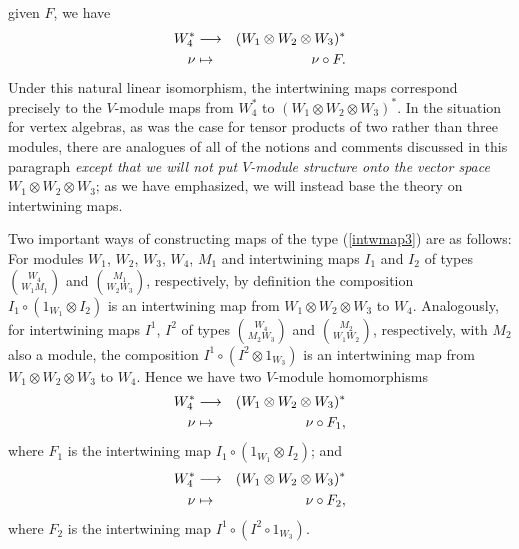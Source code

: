 \documentclass[12pt]{article}
\begin{document}
given $F$, we have
\begin{eqnarray}
W^*_4 &\longrightarrow &(W_1\otimes W_2\otimes
W_3)^*\nonumber\\
\nu&\mapsto &\nu\circ F.
\end{eqnarray}
Under this natural linear isomorphism, the intertwining maps
correspond precisely to the $V$-module maps {}from $W^*_4$ to
$(W_1\otimes W_2\otimes W_3)^*$.  In the situation for vertex
algebras, as was the case for tensor products of two rather than three
modules, there are analogues of all of the notions and comments
discussed in this paragraph {\it except that we will not put
$V$-module structure onto the vector space} $W_1\otimes W_2\otimes
W_3$; as we have emphasized, we will instead base the theory on
intertwining maps.

Two important ways of constructing maps of the type (\ref{intwmap3})
are as follows: For modules $W_1$, $W_2$, $W_3$, $W_4$, $M_1$ and
intertwining maps $I_1$ and $I_2$ of types ${W_4 \choose {W_1 M_1}}$
and ${M_1 \choose {W_2 W_3}}$, respectively, by definition the
composition $I_1\circ (1_{W_1}\otimes I_2)$ is an intertwining map
{}from $W_1\otimes W_2 \otimes W_3$ to $W_4$.  Analogously, for
intertwining maps $I^1$, $I^2$ of types ${W_4 \choose {M_2 W_3}}$ and
${M_2 \choose {W_1 W_2}}$, respectively, with $M_2$ also a module, the
composition $I^1\circ (I^2\otimes 1_{W_3})$ is an intertwining map
{}from $W_1\otimes W_2 \otimes W_3$ to $W_4$. Hence we have two
$V$-module homomorphisms
\begin{eqnarray}
W^*_4 &\longrightarrow &(W_1\otimes W_2\otimes
W_3)^*\nonumber\\
\nu&\mapsto &\nu\circ F_1,
\label{injint1}
\end{eqnarray}
where $F_1$ is the intertwining map $I_1\circ (1_{W_1}\otimes I_2)$;
and
\begin{eqnarray}
W^*_4 &\longrightarrow & (W_1\otimes W_2\otimes
W_3)^*\nonumber\\
\nu&\mapsto &\nu\circ F_2,
\label{injint2}
\end{eqnarray}
where $F_2$ is the intertwining map $I^1\circ (I^2\circ 1_{W_3})$.
\end{document}
